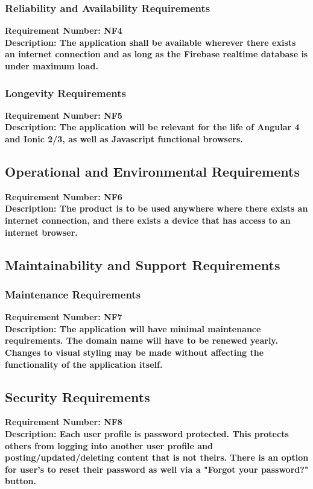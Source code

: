 \documentclass[12pt,fleqn]{article}
\begin{document}
\subsubsection{Reliability and Availability Requirements}
\begin{tcolorbox}
\textbf{Requirement Number: NF4} \\
\textbf{Description:
The application shall be available wherever there exists an internet connection and as long as the Firebase realtime database is under maximum load.}
\end{tcolorbox}

\subsubsection{Longevity Requirements}
\begin{tcolorbox}
\textbf{Requirement Number: NF5} \\
\textbf{Description:
The application will be relevant for the life of Angular 4 and Ionic 2/3, as well as Javascript functional browsers.}
\end{tcolorbox}
\subsection {Operational and Environmental Requirements}
\begin{tcolorbox}
\textbf{Requirement Number: NF6} \\
\textbf{Description:
The product is to be used anywhere where there exists an internet connection, and there exists a device that has access to an internet browser.}
\end{tcolorbox}
\subsection {Maintainability and Support Requirements}

\subsubsection{Maintenance Requirements}
\begin{tcolorbox}
\textbf{Requirement Number: NF7} \\
\textbf{Description:
The application will have minimal maintenance requirements. The domain name will have to be renewed yearly. Changes to visual styling may be made without affecting the functionality of the application itself.}
\end{tcolorbox}
\subsection {Security Requirements}
\begin{tcolorbox}
\textbf{Requirement Number: NF8} \\
\textbf{Description:
Each user profile is password protected. This protects others from logging into another user profile and posting/updated/deleting content that is not theirs. There is an option for user's to reset their password as well via a "Forgot your password?" button.}
\end{tcolorbox}
\end{document}
